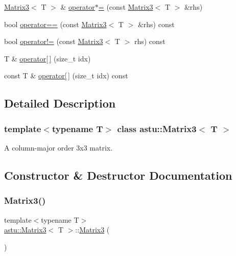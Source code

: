 \begin{DoxyCompactItemize}
\item 
\hyperlink{classastu_1_1Matrix3}{Matrix3}$<$ T $>$ \& \hyperlink{classastu_1_1Matrix3_ab3637ea5a1f5fe0cb68264475a7814e8}{operator$\ast$=} (const \hyperlink{classastu_1_1Matrix3}{Matrix3}$<$ T $>$ \&rhs)
\item 
bool \hyperlink{classastu_1_1Matrix3_a45bc188bb2d2580b6a379e209cd92303}{operator==} (const \hyperlink{classastu_1_1Matrix3}{Matrix3}$<$ T $>$ \&rhs) const
\item 
bool \hyperlink{classastu_1_1Matrix3_a3e60f2c37f594244cdb23994c27b264e}{operator!=} (const \hyperlink{classastu_1_1Matrix3}{Matrix3}$<$ T $>$ rhs) const
\item 
T \& \hyperlink{classastu_1_1Matrix3_ac9516bdeb2c41154a7014664061e507d}{operator\mbox{[}$\,$\mbox{]}} (size\+\_\+t idx)
\item 
const T \& \hyperlink{classastu_1_1Matrix3_ad9594a29b27e29bdfdd4b8e0f6138c42}{operator\mbox{[}$\,$\mbox{]}} (size\+\_\+t idx) const
\end{DoxyCompactItemize}


\subsection{Detailed Description}
\subsubsection*{template$<$typename T$>$\newline
class astu\+::\+Matrix3$<$ T $>$}

A column-\/major order 3x3 matrix. 

\subsection{Constructor \& Destructor Documentation}
\mbox{\label{classastu_1_1Matrix3_a0f2aa5af3f3ddfce06f307cfd939916b}} 
\subsubsection{\texorpdfstring{Matrix3()}{Matrix3()}\hspace{0.1cm}{\footnotesize\ttfamily [1/2]}}
{\footnotesize\ttfamily template$<$typename T$>$ \\
\hyperlink{classastu_1_1Matrix3}{astu\+::\+Matrix3}$<$ T $>$\+::\hyperlink{classastu_1_1Matrix3}{Matrix3} (\begin{DoxyParamCaption}{ }\end{DoxyParamCaption})\hspace{0.3cm}{\ttfamily [inline]}}

